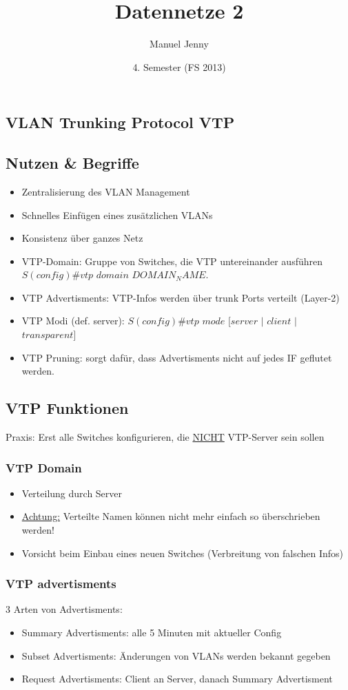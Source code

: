 \documentclass[landscape,twocolumn,a4paper]{article}
\title{
	\vspace{5cm}
	Datennetze 2
}
\author{Manuel Jenny}
\date{4. Semester (FS 2013)}
\begin{document}
\begin{footnotesize}
\section{VLAN Trunking Protocol VTP}

\subsection{Nutzen \& Begriffe}
\begin{itemize}
	\item Zentralisierung des VLAN Management
	\item Schnelles Einfügen eines zusätzlichen VLANs
	\item Konsistenz über ganzes Netz
	\item VTP-Domain: Gruppe von Switches, die VTP untereinander ausführen\\ $S(config)\#vtp$ $domain$ $DOMAIN_NAME$.
	\item VTP Advertisments: VTP-Infos werden über trunk Ports verteilt (Layer-2)
	\item VTP Modi (def. server): $S(config)\#vtp$ $mode$ $[server$ $|$ $client$ $|$ $transparent]$
	\item VTP Pruning: sorgt dafür, dass Advertisments nicht auf jedes IF geflutet werden.
\end{itemize}

\subsection{VTP Funktionen}
Praxis: Erst alle Switches konfigurieren, die \underline{NICHT} VTP-Server sein sollen\\

\subsubsection{VTP Domain}
\begin{itemize}
	\item Verteilung durch Server
	\item \underline{Achtung:} Verteilte Namen können nicht mehr einfach so überschrieben werden!
	\item Vorsicht beim Einbau eines neuen Switches (Verbreitung von falschen Infos)
\end{itemize}

\subsubsection{VTP advertisments}
3 Arten von Advertisments:
\begin{itemize}
	\item Summary Advertisments: alle 5 Minuten mit aktueller Config
	\item Subset Advertisments: Änderungen von VLANs werden bekannt gegeben
	\item Request Advertisments: Client an Server, danach Summary Advertisment
\end{itemize}


\end{footnotesize}
\end{document}
